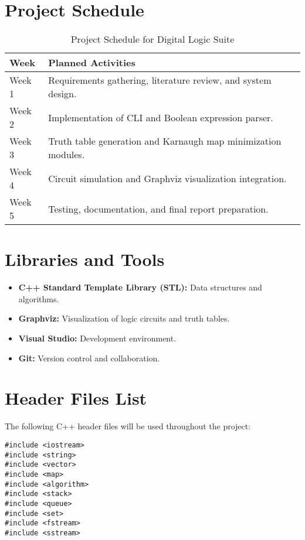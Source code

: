 \documentclass[a4paper,12pt]{article}
\begin{document}
\section{Project Schedule}
\begin{table}[h!]
    \centering
    \begin{tabular}{|>{\raggedright}p{2cm}|p{10cm}|}
        \hline
        \textbf{Week} & \textbf{Planned Activities}                                   \\
        \hline
        Week 1        & Requirements gathering, literature review, and system design. \\
        \hline
        Week 2        & Implementation of CLI and Boolean expression parser.          \\
        \hline
        Week 3        & Truth table generation and Karnaugh map minimization modules. \\
        \hline
        Week 4        & Circuit simulation and Graphviz visualization integration.    \\
        \hline
        Week 5        & Testing, documentation, and final report preparation.         \\
        \hline
    \end{tabular}
    \caption{Project Schedule for Digital Logic Suite}
\end{table}

\section{Libraries and Tools}
\begin{itemize}
    \item \textbf{C++ Standard Template Library (STL):} Data structures and algorithms.
    \item \textbf{Graphviz:} Visualization of logic circuits and truth tables.
    \item \textbf{Visual Studio:} Development environment.
    \item \textbf{Git:} Version control and collaboration.
\end{itemize}

\section{Header Files List}
The following C++ header files will be used throughout the project:
\begin{verbatim}
#include <iostream>
#include <string>
#include <vector>
#include <map>
#include <algorithm>
#include <stack>
#include <queue>
#include <set>
#include <fstream>
#include <sstream>
\end{verbatim}
\end{document}
